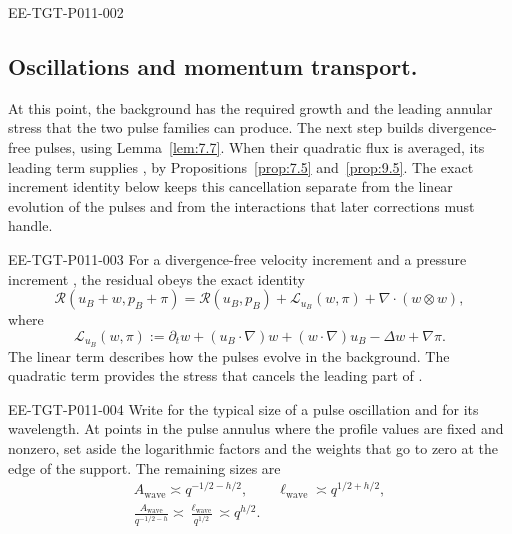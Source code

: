 \begin{EESegment}{EE-TGT-P011-002}
\subsection{Oscillations and momentum transport.}\label{sec:3.3}
At this point, the background  has the required growth and the
leading annular stress  that the two pulse families can produce. The next
step builds divergence-free pulses, using Lemma~\ref{lem:7.7}. When their quadratic flux is
averaged, its leading term supplies , by Propositions~\ref{prop:7.5}
and~\ref{prop:9.5}. The exact increment identity below keeps this cancellation separate from the
linear evolution of the pulses and from the interactions that later corrections must handle.
\end{EESegment}

\begin{EESegment}{EE-TGT-P011-003}
For a divergence-free velocity increment  and a pressure increment
, the residual obeys the exact identity
\[
 \mathscr R(u_B+w,p_B+\pi)=\mathscr R(u_B,p_B)+\mathcal L_{u_B}(w,\pi)
   +\nabla\cdot(w\otimes w),
\]
where
\[
 \mathcal L_{u_B}(w,\pi):=\partial_t w+(u_B\cdot\nabla)w+(w\cdot\nabla)u_B
   -\Delta w+\nabla\pi.
\]
The linear term describes how the pulses evolve in the background. The quadratic term provides
the stress that cancels the leading part of
.
\end{EESegment}

\begin{EESegment}{EE-TGT-P011-004}
Write  for the typical size of a pulse oscillation and
 for its wavelength. At points in the pulse annulus
where the profile values are fixed and nonzero, set aside the logarithmic factors and the weights
that go to zero at the edge of the support. The remaining sizes are
\[
 \begin{gathered}
  A_{\mathrm{wave}}\asymp q^{-1/2-h/2},\qquad
  \ell_{\mathrm{wave}}\asymp q^{1/2+h/2},\\
  \frac{A_{\mathrm{wave}}}{q^{-1/2-h}}\asymp
  \frac{\ell_{\mathrm{wave}}}{q^{1/2}}\asymp q^{h/2}.
 \end{gathered}
\]
\end{EESegment}

